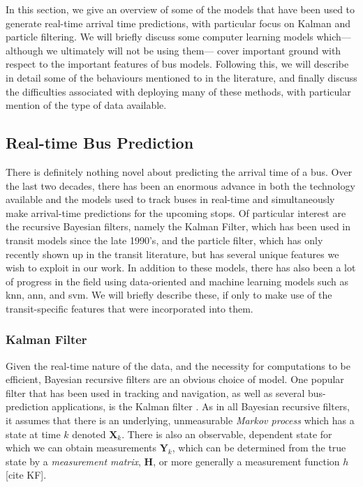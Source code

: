 \documentclass[12pt,a4paper]{article}
\newcommand{\bY}{\mathbf{Y}}
\newcommand{\bX}{\mathbf{X}}
\newcommand{\mat}[1]{\mathbf{#1}}
\newcommand{\kf}{Kalman filter}
\begin{document}
In this section, we give an overview of some of the models that have been used
to generate real-time arrival time predictions,
with particular focus on Kalman and particle filtering.
We will briefly discuss some computer learning models which---%
although we ultimately will not be using them---%
cover important ground with respect to the important features of bus models.
Following this, we will describe in detail some of the
behaviours mentioned to in the literature,
and finally discuss the difficulties associated with deploying many of these methods,
with particular mention of the type of data available.


\subsection{Real-time Bus Prediction}
\label{sec:history}

There is definitely nothing novel about predicting the arrival time of a bus.
Over the last two decades,
there has been an enormous advance in both the technology available and the models used
to track buses in real-time and simultaneously make arrival-time predictions for the upcoming stops.
Of particular interest are the recursive Bayesian filters,
namely the Kalman Filter, which has been used in transit models since the late 1990's,
and the particle filter, which has only recently shown up in the transit literature,
but has several unique features we wish to exploit in our work.
In addition to these models,
there has also been a lot of progress in the field using data-oriented and machine learning models
such as \gls{knn}, \gls{ann}, and \gls{svm}.
We will briefly describe these, if only to make use of the transit-specific features
that were incorporated into them.



\subsubsection{Kalman Filter}
\label{sec:kalman-filter}

Given the real-time nature of the data, and the necessity for computations to be efficient,
Bayesian recursive filters are an obvious choice of model.
One popular filter that has been used in tracking and navigation,
as well as several bus-prediction applications,
is the \kf{} \citep{wall-dailey:1999,dailey:2001,cn}.
As in all Bayesian recursive filters,
it assumes that there is an underlying, unmeasurable \emph{Markov process}
which has a state at time $k$ denoted $\bX_k$.
There is also an observable, dependent state for which we can obtain measurements $\bY_k$,
which can be determined from the true state by a \emph{measurement matrix}, $\mat{H}$,
or more generally a measurement function $h$
\citep{cn} [cite KF].
\end{document}
